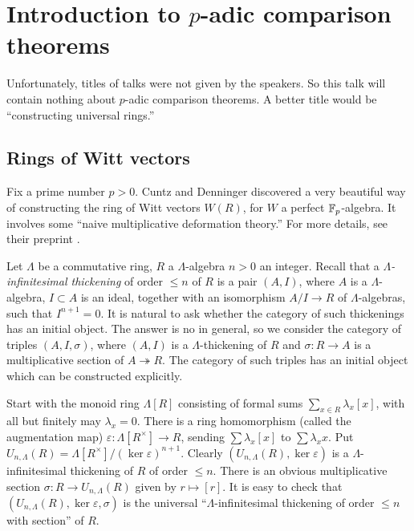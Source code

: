 
\section{Introduction to \texorpdfstring{$p$}{p}-adic comparison theorems}




Unfortunately, titles of talks were not given by the speakers. So this talk 
will contain nothing about $p$-adic comparison theorems. A better title would 
be ``constructing universal rings.'' 





\subsection{Rings of Witt vectors}

Fix a prime number $p>0$. Cuntz and Denninger discovered a very beautiful 
way of constructing the ring of Witt vectors $W(R)$, for $W$ a perfect 
$\mathbb{F}_p$-algebra. It involves some ``naive multiplicative deformation theory.'' 
For more details, see their preprint \cite{cd13}. 

Let $\Lambda$ be a commutative ring, $R$ a $\Lambda$-algebra $n>0$ an integer. 
Recall that a \emph{$\Lambda$-infinitesimal thickening} of order 
$\leqslant n$ of $R$ is a pair $(A,I)$, where $A$ is a $\Lambda$-algebra, 
$I\subset A$ is an ideal, together with an isomorphism $A/I\to R$ of 
$\Lambda$-algebras, such that $I^{n+1}=0$. It is natural to ask whether the 
category of such thickenings has an initial object. The answer is no in 
general, so we consider the category of triples $(A,I,\sigma)$, where 
$(A,I)$ is a $\Lambda$-thickening of $R$ and $\sigma:R\to A$ is a 
multiplicative section of $A\twoheadrightarrow R$. The category of such triples 
has an initial object which can be constructed explicitly. 

Start with the monoid ring $\Lambda[R]$ consisting of formal sums 
$\sum_{x\in R} \lambda_x [x]$, with all but finitely may $\lambda_x=0$. 
There is a ring homomorphism (called the augmentation map) 
$\varepsilon:\Lambda[R^\times] \to R$, sending $\sum \lambda_x [x]$ to 
$\sum \lambda_x x$. Put 
$U_{n,\Lambda}(R) = \Lambda[R^\times]/(\ker\varepsilon)^{n+1}$. Clearly 
$(U_{n,\Lambda}(R),\ker\varepsilon)$ is a $\Lambda$-infinitesimal thickening of 
$R$ of order $\leqslant n$. There is an obvious multiplicative section 
$\sigma:R\to U_{n,\Lambda}(R)$ given by $r\mapsto [r]$. It is easy to check 
that $(U_{n,\Lambda}(R),\ker\varepsilon,\sigma)$ is the universal 
``$\Lambda$-infinitesimal thickening of order $\leqslant n$ with section'' of 
$R$. 

